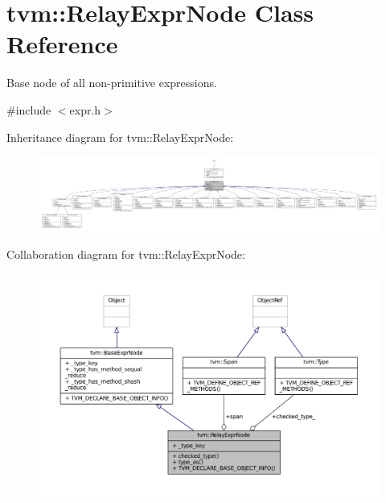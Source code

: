 \hypertarget{classtvm_1_1RelayExprNode}{}\section{tvm\+:\+:Relay\+Expr\+Node Class Reference}
\label{classtvm_1_1RelayExprNode}


Base node of all non-\/primitive expressions.  




{\ttfamily \#include $<$expr.\+h$>$}



Inheritance diagram for tvm\+:\+:Relay\+Expr\+Node\+:
\nopagebreak
\begin{figure}[H]
\begin{center}
\leavevmode
\includegraphics[width=350pt]{classtvm_1_1RelayExprNode__inherit__graph}
\end{center}
\end{figure}


Collaboration diagram for tvm\+:\+:Relay\+Expr\+Node\+:
\nopagebreak
\begin{figure}[H]
\begin{center}
\leavevmode
\includegraphics[width=350pt]{classtvm_1_1RelayExprNode__coll__graph}
\end{center}
\end{figure}
